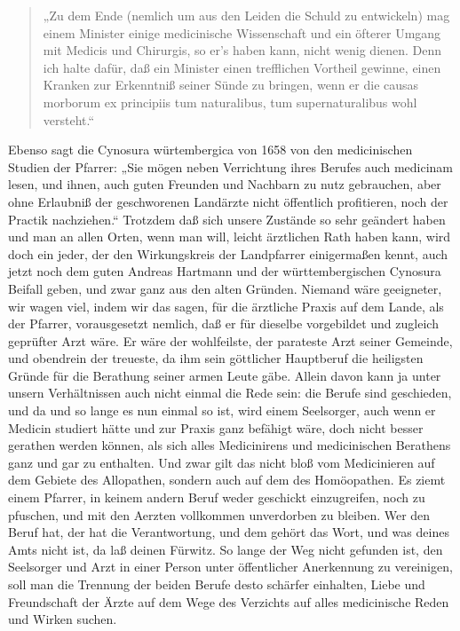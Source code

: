 \begin{quote}
„Zu dem Ende (nemlich um aus den Leiden die Schuld zu entwickeln) mag einem Minister einige medicinische Wissenschaft und ein öfterer Umgang mit Medicis und Chirurgis, so er’s haben kann, nicht wenig dienen. Denn ich halte dafür, daß ein Minister einen trefflichen Vortheil gewinne, einen Kranken zur Erkenntniß seiner Sünde zu bringen, wenn er die causas morborum ex principiis tum naturalibus, tum supernaturalibus wohl versteht.“
\end{quote}

Ebenso sagt die Cynosura würtembergica von 1658 von den medicinischen Studien der Pfarrer: „Sie mögen neben Verrichtung ihres Berufes auch
medicinam lesen, und ihnen, auch guten Freunden und Nachbarn zu nutz gebrauchen, aber ohne Erlaubniß der geschworenen Landärzte nicht öffentlich profitieren, noch der Practik nachziehen.“ Trotzdem daß sich unsere Zustände so sehr geändert haben und man an allen Orten, wenn man will, leicht ärztlichen Rath haben kann, wird doch ein jeder, der den Wirkungskreis der Landpfarrer einigermaßen kennt, auch jetzt noch dem guten Andreas Hartmann und der württembergischen Cynosura Beifall geben, und zwar ganz aus den alten Gründen. Niemand wäre geeigneter, wir wagen viel, indem wir das sagen, für die ärztliche Praxis auf dem Lande, als der Pfarrer, vorausgesetzt nemlich, daß er für dieselbe vorgebildet und zugleich geprüfter Arzt wäre. Er wäre der wohlfeilste, der parateste Arzt seiner Gemeinde, und obendrein der treueste, da ihm sein göttlicher Hauptberuf die heiligsten Gründe für die Berathung seiner armen Leute gäbe. Allein davon kann ja unter unsern Verhältnissen auch nicht einmal die Rede sein: die Berufe sind geschieden, und da und so lange es nun einmal so ist, wird einem Seelsorger, auch wenn er Medicin studiert hätte und zur Praxis ganz befähigt wäre, doch nicht besser gerathen werden können, als sich alles Medicinirens und medicinischen Berathens ganz und gar zu enthalten. Und zwar gilt das nicht bloß vom Medicinieren auf dem Gebiete des Allopathen, sondern auch auf dem des Homöopathen. Es ziemt einem Pfarrer, in keinem andern Beruf weder geschickt einzugreifen, noch zu pfuschen, und mit den Aerzten vollkommen unverdorben zu bleiben. Wer den Beruf hat, der hat die Verantwortung, und dem gehört das Wort, und was deines
Amts nicht ist, da laß deinen Fürwitz. So lange der Weg nicht gefunden ist, den Seelsorger und Arzt in einer Person unter öffentlicher Anerkennung zu vereinigen, soll man die Trennung der beiden Berufe desto schärfer einhalten, Liebe und Freundschaft der Ärzte auf dem Wege des Verzichts auf alles medicinische Reden und Wirken suchen.

